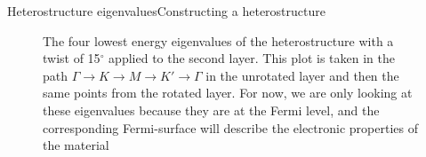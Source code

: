 \documentclass[9pt]{beamer}
\begin{document}
\begin{frame}{Heterostructure eigenvalues}{Constructing a heterostructure}
  \begin{figure}
    \centering
    \caption{The four lowest energy eigenvalues of the heterostructure with a twist of 15$^\circ$ applied to the second layer. This plot is taken in the path $\Gamma \rightarrow K \rightarrow M \rightarrow K' \rightarrow \Gamma$ in the unrotated layer and then the same points from the rotated layer. For now, we are only looking at these eigenvalues because they are at the Fermi level, and the corresponding Fermi-surface will describe the electronic properties of the material}
  \end{figure}
\end{frame}
\end{document}
